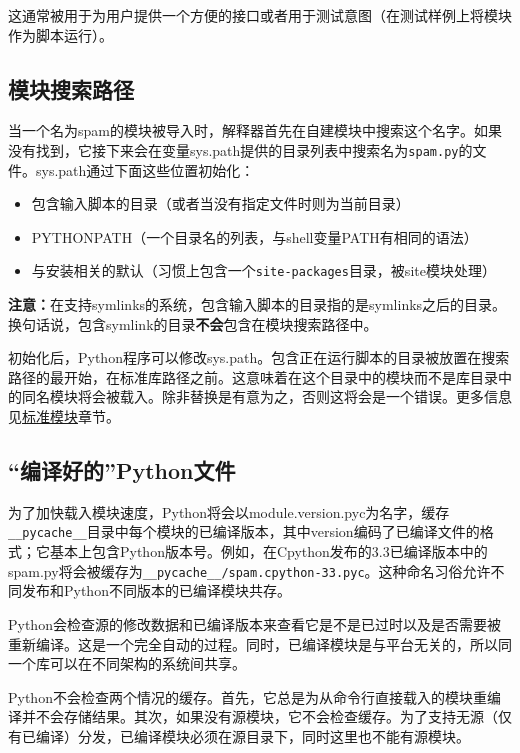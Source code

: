 \documentclass[../package_guide.tex]{subfiles}
\begin{document}
这通常被用于为用户提供一个方便的接口或者用于测试意图（在测试样例上将模块作为脚本运行）。

\subsection{模块搜索路径}

当一个名为spam的模块被导入时，解释器首先在自建模块中搜索这个名字。如果没有找到，它接下来会在变量sys.path提供的目录列表中搜索名为\lstinline{spam.py}的文件。sys.path通过下面这些位置初始化：
\begin{itemize}
    \item 包含输入脚本的目录（或者当没有指定文件时则为当前目录）
    \item PYTHONPATH（一个目录名的列表，与shell变量PATH有相同的语法）
    \item 与安装相关的默认（习惯上包含一个\lstinline{site-packages}目录，被site模块处理）
\end{itemize}

\textbf{注意：}在支持symlinks的系统，包含输入脚本的目录指的是symlinks之后的目录。换句话说，包含symlink的目录\textbf{不会}包含在模块搜索路径中。

初始化后，Python程序可以修改sys.path。包含正在运行脚本的目录被放置在搜索路径的最开始，在标准库路径之前。这意味着在这个目录中的模块而不是库目录中的同名模块将会被载入。除非替换是有意为之，否则这将会是一个错误。更多信息见\href{https://docs.python.org/3/tutorial/modules.html#tut-standardmodules}{标准模块}章节。

\subsection{“编译好的”Python文件}

为了加快载入模块速度，Python将会以module.version.pyc为名字，缓存\lstinline{__pycache__}目录中每个模块的已编译版本，其中version编码了已编译文件的格式；它基本上包含Python版本号。例如，在Cpython发布的3.3已编译版本中的spam.py将会被缓存为\lstinline{__pycache__/spam.cpython-33.pyc}。这种命名习俗允许不同发布和Python不同版本的已编译模块共存。

Python会检查源的修改数据和已编译版本来查看它是不是已过时以及是否需要被重新编译。这是一个完全自动的过程。同时，已编译模块是与平台无关的，所以同一个库可以在不同架构的系统间共享。

Python不会检查两个情况的缓存。首先，它总是为从命令行直接载入的模块重编译并不会存储结果。其次，如果没有源模块，它不会检查缓存。为了支持无源（仅有已编译）分发，已编译模块必须在源目录下，同时这里也不能有源模块。
\end{document}

